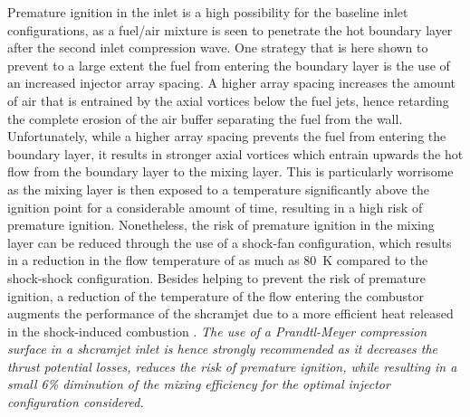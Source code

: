 Premature ignition in the inlet is a high possibility for the baseline inlet
configurations, as a fuel/air mixture is seen to penetrate the
hot boundary layer after the second inlet compression wave. One strategy that is
here shown to prevent to a large extent the fuel
from entering the boundary layer is the use of an increased injector array spacing.
A higher array spacing increases the amount of air that is entrained by the axial vortices
below the fuel jets, hence retarding the complete erosion of the air buffer separating
the fuel from the wall. Unfortunately,
while a higher array spacing prevents the fuel from entering the boundary layer,
it results in stronger axial vortices which entrain upwards the hot flow from the
boundary layer to the mixing layer. This is particularly worrisome as the mixing
layer is then exposed to a temperature significantly above the ignition
point for a considerable amount of time, resulting in a high risk of premature ignition.
Nonetheless, the risk of premature ignition in the mixing layer can be reduced
through the use of a shock-fan configuration, which results in
a reduction in the flow temperature of as much as 80~K compared to the
shock-shock configuration. Besides helping to prevent the risk of premature ignition,
a reduction of the temperature of the flow entering the combustor augments the
performance of the shcramjet due to a
more efficient heat released in the shock-induced combustion \cite{jpp:2001:sislian}.
\emph{The use of a Prandtl-Meyer compression surface in a shcramjet inlet is hence strongly
recommended as it decreases the thrust potential losses, reduces
the risk of premature ignition, while resulting in a small 6\% diminution of the
mixing efficiency for the optimal injector configuration considered.}


